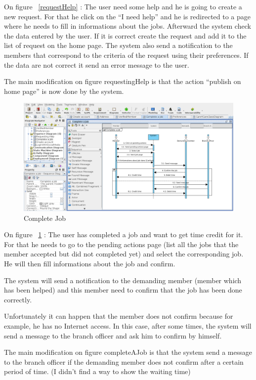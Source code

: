 \documentclass[11pt, a4paper]{article}   	%
\begin{document}
On figure ~\ref{requestHelp} : The user need some help and he is going to create a new request. For that he click on the \enquote{I need help}
and he is redirected to a page where he needs to fill in informations about the jobs. Afterward the system check the data entered by the user.
If it is correct create the request and add it to the list of request on the home page. The system also send a notification to the members that
correspond to the criteria of the request using their preferences. If the data are not correct it send an error message to the user.

The main modification on figure {requestingHelp} is that the action \enquote{publish on home page} is now done by the system. 

\begin{figure}[!ht]
   \includegraphics[width=\textwidth]{completeJob.png}
   \caption{\label{completeJob} Complete Job}
\end{figure}

On figure ~\ref{completeJob} : The user has completed a job and want to get time credit for it. For that he needs to go to the pending actions page (list all the jobs that the member accepted but did not completed yet) and select the corresponding job. He will then fill informations about the job and confirm. 

The system will send a notification to the demanding member (member which has been helped) and this member need to confirm that the job has been done correctly.

Unfortunately it can happen that the member does not confirm because for example, he has no Internet access. In this case, after some times, the system will send a message to the branch officer and ask him to confirm by himself.

The main modification on figure {completeAJob} is that the system send a message to the branch officer if the demanding member does not confirm after a certain period of time. (I didn't find a way to show the waiting time)
\end{document}
